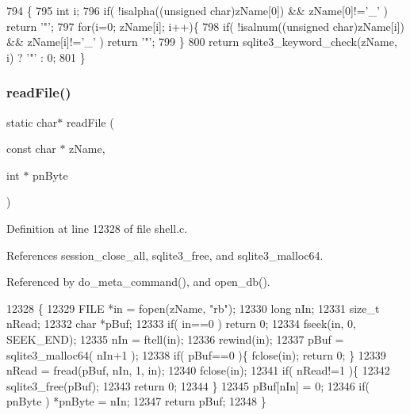 \begin{DoxyCode}
794                                         \{
795   \textcolor{keywordtype}{int} i;
796   \textcolor{keywordflow}{if}( !isalpha((\textcolor{keywordtype}{unsigned} \textcolor{keywordtype}{char})zName[0]) && zName[0]!=\textcolor{charliteral}{'\_'} ) \textcolor{keywordflow}{return} \textcolor{charliteral}{'"'};
797   \textcolor{keywordflow}{for}(i=0; zName[i]; i++)\{
798     \textcolor{keywordflow}{if}( !isalnum((\textcolor{keywordtype}{unsigned} \textcolor{keywordtype}{char})zName[i]) && zName[i]!=\textcolor{charliteral}{'\_'} ) \textcolor{keywordflow}{return} \textcolor{charliteral}{'"'};
799   \}
800   \textcolor{keywordflow}{return} sqlite3_keyword_check(zName, i) ? \textcolor{charliteral}{'"'} : 0;
801 \}
\end{DoxyCode}
\mbox{\label{shell_8c_a8964d295ec8deb7f396168e5ee4cf4a4}} 
\subsubsection{read\+File()}
{\footnotesize\ttfamily static char$\ast$ read\+File (\begin{DoxyParamCaption}\item[{const char $\ast$}]{z\+Name,  }\item[{int $\ast$}]{pn\+Byte }\end{DoxyParamCaption})\hspace{0.3cm}{\ttfamily [static]}}



Definition at line 12328 of file shell.\+c.



References session\+\_\+close\+\_\+all, sqlite3\+\_\+free, and sqlite3\+\_\+malloc64.



Referenced by do\+\_\+meta\+\_\+command(), and open\+\_\+db().


\begin{DoxyCode}
12328                                                      \{
12329   FILE *in = fopen(zName, \textcolor{stringliteral}{"rb"});
12330   \textcolor{keywordtype}{long} nIn;
12331   \textcolor{keywordtype}{size\_t} nRead;
12332   \textcolor{keywordtype}{char} *pBuf;
12333   \textcolor{keywordflow}{if}( in==0 ) \textcolor{keywordflow}{return} 0;
12334   fseek(in, 0, SEEK\_END);
12335   nIn = ftell(in);
12336   rewind(in);
12337   pBuf = sqlite3_malloc64( nIn+1 );
12338   \textcolor{keywordflow}{if}( pBuf==0 )\{ fclose(in); \textcolor{keywordflow}{return} 0; \}
12339   nRead = fread(pBuf, nIn, 1, in);
12340   fclose(in);
12341   \textcolor{keywordflow}{if}( nRead!=1 )\{
12342     sqlite3_free(pBuf);
12343     \textcolor{keywordflow}{return} 0;
12344   \}
12345   pBuf[nIn] = 0;
12346   \textcolor{keywordflow}{if}( pnByte ) *pnByte = nIn;
12347   \textcolor{keywordflow}{return} pBuf;
12348 \}
\end{DoxyCode}
\mbox{\label{shell_8c_a15793439af47119edab12f99b0ed8a57}} 
